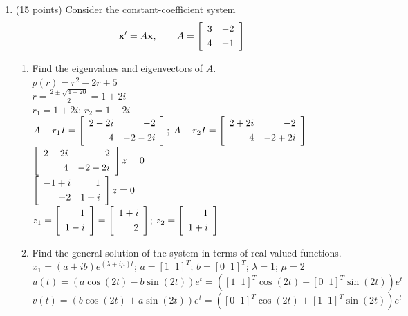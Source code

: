 \documentclass{article}
\begin{document}
\begin{enumerate}
\bigskip
\item (15 points) Consider the constant-coefficient system
\[
{\bf x}\sp\prime=A{\bf x},\qquad
A=\left[
\begin{array}{rr}
3&-2\smallskip\\
4&-1
\end{array}
\right]
\]
\begin{enumerate}
\item
Find the eigenvalues and eigenvectors of $A$.
\\$p(r)=r^2-2r+5$
\\$r=\frac{2\pm\sqrt{4-20}}{2}=1\pm2i$
\\$r_1=1+2i$; $r_2=1-2i$
\\$A-r_1I=\left[
\begin{array}{rr}2-2i&-2\smallskip\\4&-2-2i\end{array}\right]$; $A-r_2I=\left[\begin{array}{rr}2+2i&-2\smallskip\\4&-2+2i\end{array}\right]$
\\$\left[\begin{array}{rr}2-2i&-2\smallskip\\4&-2-2i\end{array}\right]z=0$
\\$\left[\begin{array}{rr}-1+i&1\smallskip\\-2&1+i\end{array}\right]z=0$
\\$z_1=\left[\begin{array}{rr}1\smallskip\\1-i\end{array}\right]=\left[\begin{array}{rr}1+i\smallskip\\2\end{array}\right]$; $z_2=\left[\begin{array}{rr}1\smallskip\\1+i\end{array}\right]$
\item
Find the general solution of the system in terms of real-valued functions.
\\$x_1=(a+ib)e^{(\lambda+i\mu)t}$; $a=[1\;\;1]^T$; $b=[0\;\;1]^T$; $\lambda=1$; $\mu=2$
\\$u(t)=(a\cos(2t)-b\sin(2t))e^t=([1\;\;1]^T\cos(2t)-[0\;\;1]^T\sin(2t))e^t$
\\$v(t)=(b\cos(2t)+a\sin(2t))e^t=([0\;\;1]^T\cos(2t)+[1\;\;1]^T\sin(2t))e^t$

\end{enumerate}
\end{enumerate}
\end{document}
